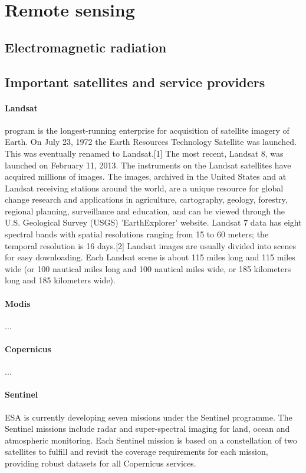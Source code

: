 \section{Remote sensing}



\subsection{Electromagnetic radiation}



\subsection{Important satellites and service providers}

\paragraph{Landsat} program is the longest-running enterprise for acquisition of satellite imagery of Earth. On July 23, 1972 the Earth Resources Technology Satellite was launched. This was eventually renamed to Landsat.[1] The most recent, Landsat 8, was launched on February 11, 2013. The instruments on the Landsat satellites have acquired millions of images. The images, archived in the United States and at Landsat receiving stations around the world, are a unique resource for global change research and applications in agriculture, cartography, geology, forestry, regional planning, surveillance and education, and can be viewed through the U.S. Geological Survey (USGS) 'EarthExplorer' website. Landsat 7 data has eight spectral bands with spatial resolutions ranging from 15 to 60 meters; the temporal resolution is 16 days.[2] Landsat images are usually divided into scenes for easy downloading. Each Landsat scene is about 115 miles long and 115 miles wide (or 100 nautical miles long and 100 nautical miles wide, or 185 kilometers long and 185 kilometers wide).

\paragraph{Modis} ...

\paragraph{Copernicus} ...

\paragraph{Sentinel} ESA is currently developing seven missions under the Sentinel programme. The Sentinel missions include radar and super-spectral imaging for land, ocean and atmospheric monitoring. Each Sentinel mission is based on a constellation of two satellites to fulfill and revisit the coverage requirements for each mission, providing robust datasets for all Copernicus services.

